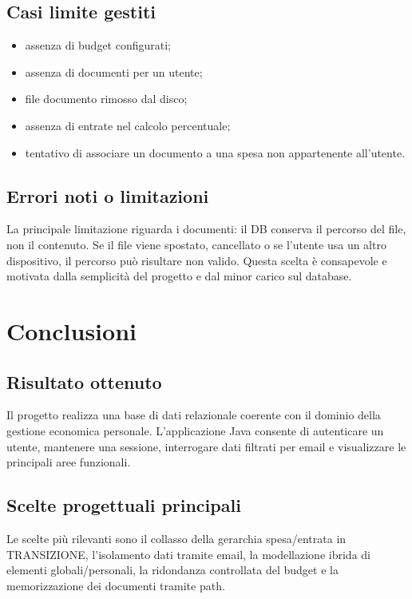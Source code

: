 \documentclass[11pt,a4paper]{article}
\begin{document}
\subsection{Casi limite gestiti}
\begin{itemize}
    \item assenza di budget configurati;
    \item assenza di documenti per un utente;
    \item file documento rimosso dal disco;
    \item assenza di entrate nel calcolo percentuale;
    \item tentativo di associare un documento a una spesa non appartenente all'utente.
\end{itemize}

\subsection{Errori noti o limitazioni}
La principale limitazione riguarda i documenti: il DB conserva il percorso del file, non il contenuto. Se il file viene spostato, cancellato o se l'utente usa un altro dispositivo, il percorso può risultare non valido. Questa scelta è consapevole e motivata dalla semplicità del progetto e dal minor carico sul database.

\section{Conclusioni}
\subsection{Risultato ottenuto}
Il progetto realizza una base di dati relazionale coerente con il dominio della gestione economica personale. L'applicazione Java consente di autenticare un utente, mantenere una sessione, interrogare dati filtrati per email e visualizzare le principali aree funzionali.

\subsection{Scelte progettuali principali}
Le scelte più rilevanti sono il collasso della gerarchia spesa/entrata in \textsc{TRANSIZIONE}, l'isolamento dati tramite email, la modellazione ibrida di elementi globali/personali, la ridondanza controllata del budget e la memorizzazione dei documenti tramite path.
\end{document}
